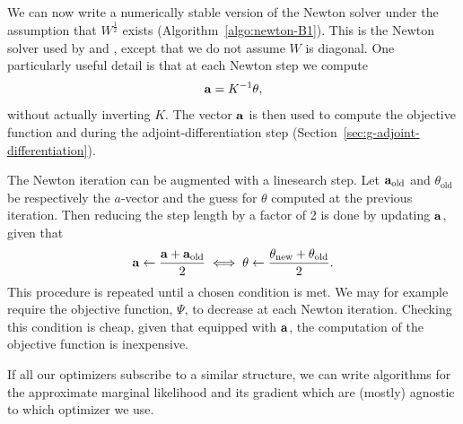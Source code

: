 \documentclass[stslayout, noinfoline]{imsart}
\theoremstyle{definition}
\begin{document}
We can now write a numerically stable version of the Newton solver
under the assumption that $W^\frac{1}{2}$ exists (Algorithm~\ref{algo:newton-B1}).
This is the Newton solver used by \citet{Rasmussen:2006} and \citet{Margossian:2020-laplace},
except that we do not assume $W$ is diagonal.
One particularly useful detail is that at each Newton step we compute
\begin{equation}
  {\bf a} = K^{-1} \theta,
\end{equation}
%
without actually inverting $K$.
The vector $\bf a$ is then used to compute the objective function
and during the adjoint-differentiation step (Section~\ref{sec:g-adjoint-differentiation}).

The Newton iteration can be augmented with a linesearch step.
Let ${\bf a}_\text{old}$ and $\theta_\text{old}$ be respectively the $a$-vector and the guess for $\theta$ computed at the previous iteration.
Then reducing the step length by a factor of 2 is done by updating $\bf a$, given that
\begin{equation*}
  {\bf a} \gets \frac{ {\bf a} + {\bf a}_\text{old}}{2} \iff \theta \gets \frac{\theta_\text{new} + \theta_\text{old}}{2}.
\end{equation*}
This procedure is repeated until a chosen condition is met.
We may for example require the objective function, $\Psi$, to decrease at each Newton iteration.
Checking this condition is cheap, given that equipped with $\bf a$, the computation of the objective function is inexpensive.

If all our optimizers subscribe to a similar structure,
we can write algorithms for the approximate marginal likelihood and its gradient
which are (mostly) agnostic to which optimizer we use.
\end{document}
